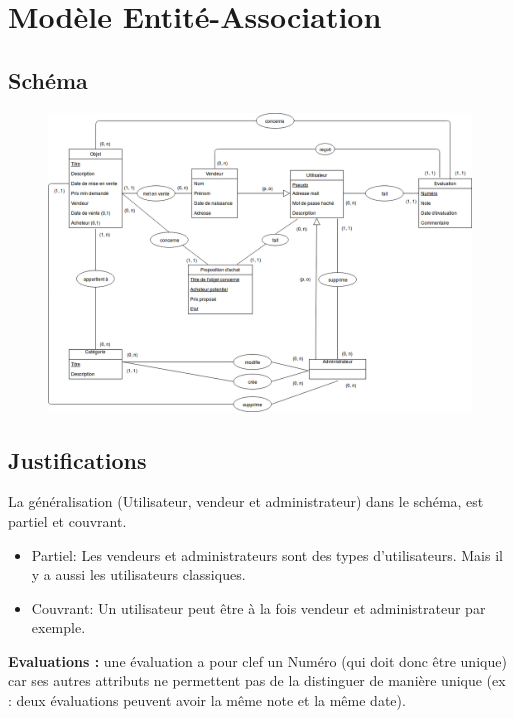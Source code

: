 \documentclass[a4paper,11pt]{article}
\begin{document}
\section{Modèle Entité-Association}
\subsection{Schéma}
\begin{center}
  \begin{figure}
    \includegraphics[width = 25cm]{schemaEA}
  \end{figure}
\end{center}

\newpage

\subsection{Justifications}
La généralisation (Utilisateur, vendeur et administrateur) dans le schéma, est partiel et couvrant.
\begin{itemize}
\item Partiel: Les vendeurs et administrateurs sont des types d'utilisateurs. Mais il y a aussi les utilisateurs classiques.
\item Couvrant: Un utilisateur peut être à la fois vendeur et administrateur par exemple.
\end{itemize}

\textbf{Evaluations :} une évaluation a pour clef un Numéro (qui doit donc être unique) car ses autres attributs ne permettent pas de la
	      distinguer de manière unique (ex : deux évaluations peuvent avoir la même note et la même date).
\end{document}
